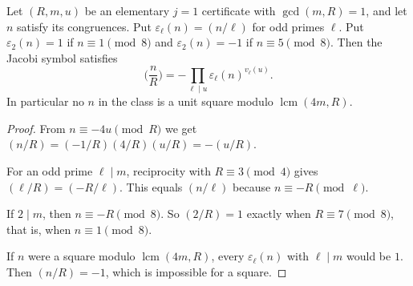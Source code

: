 \begin{lemma}\label{lem:j1square}
Let $(R,m,u)$ be an elementary $j=1$ certificate with $\gcd(m,R)=1$, and let $n$ satisfy its congruences. Put $\varepsilon_\ell(n)=(n/\ell)$ for odd primes $\ell$. Put $\varepsilon_2(n)=1$ if $n\equiv1\pmod8$ and $\varepsilon_2(n)=-1$ if $n\equiv5\pmod8$. Then the Jacobi symbol satisfies
\[
\Big(\frac nR\Big)=-\prod_{\ell\mid u}\varepsilon_\ell(n)^{v_\ell(u)}.
\]
In particular no $n$ in the class is a unit square modulo $\operatorname{lcm}(4m,R)$.
\end{lemma}
\begin{proof}
From $n\equiv-4u\pmod R$ we get $(n/R)=(-1/R)(4/R)(u/R)=-(u/R)$.

For an odd prime $\ell\mid m$, reciprocity with $R\equiv3\pmod4$ gives $(\ell/R)=(-R/\ell)$. This equals $(n/\ell)$ because $n\equiv-R\pmod\ell$.

If $2\mid m$, then $n\equiv-R\pmod8$. So $(2/R)=1$ exactly when $R\equiv7\pmod 8$, that is, when $n\equiv1\pmod8$.

If $n$ were a square modulo $\operatorname{lcm}(4m,R)$, every $\varepsilon_\ell(n)$ with $\ell\mid m$ would be $1$. Then $(n/R)=-1$, which is impossible for a square.
\end{proof}

